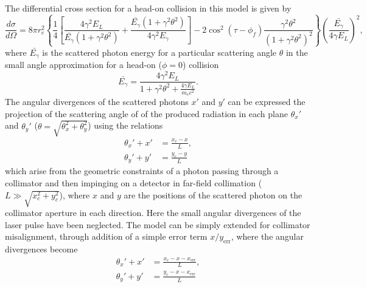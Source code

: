 \documentclass[../main.tex]{subfiles}
\begin{document}
The differential cross section for a head-on collision in this model is given by
\begin{equation}
\frac{d\sigma}{d\Omega} = 8\pi r_{e}^{2}\left\{\frac{1}{4}\left[\frac{4\gamma^{2}E_{L}}{\bar{E_{\gamma}}\left(1+\gamma^{2}\theta^{2}\right)}+\frac{\bar{E_{\gamma}}\left(1+\gamma^{2}\theta^{2}\right)}{4\gamma^{2}E_{\gamma}}\right]-2\cos^{2}\left(\tau-\phi_{f}\right)\frac{\gamma^{2}\theta^{2}}{\left(1+\gamma^{2}\theta^{2}\right)^{2}}\right\}\left(\frac{\bar{E_{\gamma}}}{4\gamma E_{L}}\right)^{2},
\label{eq:sun_differential_cross_section}    
\end{equation}
where $\bar{E_{\gamma}}$ is the scattered photon energy for a particular scattering angle $\theta$ in the small angle approximation for a head-on ($\phi=0$) collision
\begin{equation}
\bar{E_{\gamma}} = \frac{4\gamma^{2}E_{L}}{1+\gamma^{2}\theta^{2}+\frac{4\gamma E_{L}}{m_{e}c^{2}}}.
\label{eq:sun_Egamma_bar}    
\end{equation}
The angular divergences of the scattered photons $x'$ and $y'$ can be expressed the projection of the scattering angle of of the produced radiation in each plane $\theta_{x}'$ and $\theta_{y}'$ ($\theta = \sqrt{\theta_{x}^{2}+\theta_{y}^{2}}$) using the relations
\begin{align}
\theta_{x}' + x' &= \frac{x_{c}-x}{L}, \nonumber \\
\theta_{y}' + y' &= \frac{y_{c}-y}{L}
\label{eq:sun_angular_divergence}    
\end{align}
which arise from the geometric constraints of a photon passing through a collimator and then impinging on a detector in far-field collimation ($L \gg \sqrt{x_{c}^{2}+y_{c}^{2}}$), where $x$ and $y$ are the positions of the scattered photon on the collimator aperture in each direction. Here the small angular divergences of the laser pulse have been neglected. The model can be simply extended for collimator misalignment, through addition of a simple error term \cite{sun2009characterizations} $x/y_{\mathrm{err}}$, where the angular divergences become
\begin{align}
\theta_{x}' + x' &= \frac{x_{c}-x-x_{\mathrm{err}}}{L}, \nonumber \\
\theta_{y}' + y' &= \frac{y_{c}-x-x_{\mathrm{err}}}{L}
\label{eq:sun_collimator_misallignment}    
\end{align}
\end{document}
